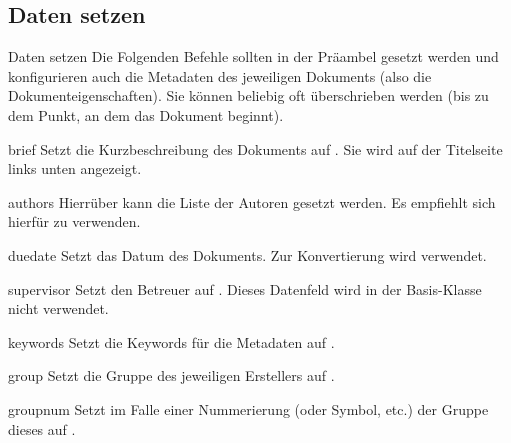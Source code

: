 \documentclass{sopra-seraphim}
\begin{document}
    \subsection{Daten setzen}
    \label{sec:DatenSetzen}
    \begin{frame}{Daten setzen}
        Die Folgenden Befehle sollten in der Präambel gesetzt werden und konfigurieren
        auch die Metadaten des jeweiligen Dokuments (also die Dokumenteigenschaften).
        Sie können beliebig oft überschrieben werden (bis zu dem Punkt, an dem
        das Dokument beginnt). 

        \begin{command}{brief}{}
            Setzt die Kurzbeschreibung des Dokuments auf . Sie wird auf der Titelseite links unten angezeigt. 
        \end{command}

        \begin{command}{authors}{}
            Hierrüber kann die Liste der Autoren gesetzt werden. Es empfiehlt sich
            hierfür  zu verwenden.
        \end{command}

        \begin{command}{duedate}{}
           Setzt das Datum des Dokuments. Zur Konvertierung wird 
           verwendet.
        \end{command}

        \begin{command}{supervisor}{}
            Setzt den Betreuer auf . Dieses Datenfeld wird in der Basis-Klasse nicht verwendet. 
        \end{command}

        \begin{command}{keywords}{}
            Setzt die Keywords für die Metadaten auf .
        \end{command}

        \begin{command}{group}{}
            Setzt die Gruppe des jeweiligen Erstellers auf .%
        \end{command}

        \begin{command}{groupnum}{}
            Setzt im Falle einer Nummerierung (oder Symbol, etc.) der Gruppe dieses
            auf .
        \end{command}
    \end{frame}
\end{document}
